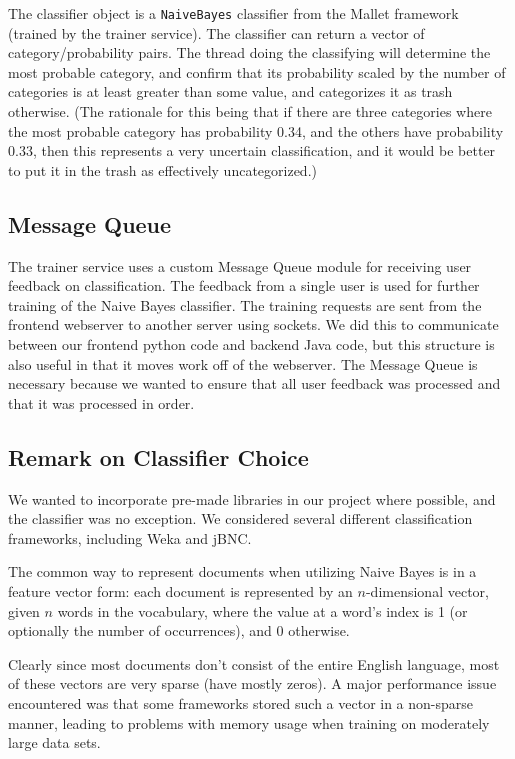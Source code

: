\documentclass[letterpaper]{article}
\begin{document}
The classifier object is a \texttt{NaiveBayes} classifier from the Mallet framework (trained by the trainer service). The classifier can return a vector of category/probability pairs. The thread doing the classifying will determine the most probable category, and confirm that its probability scaled by the number of categories is at least greater than some value, and categorizes it as trash otherwise. (The rationale for this being that if there are three categories where the most probable category has probability 0.34, and the others have probability 0.33, then this represents a very uncertain classification, and it would be better to put it in the trash as effectively uncategorized.)

\subsection{Message Queue}
\label{MessageQueueSection}
The trainer service uses a custom Message Queue module for receiving user feedback on classification. The feedback from a single user is used for further training of the Naive Bayes classifier. The training requests are sent from the frontend webserver to another server using sockets. We did this to communicate between our frontend python code and backend Java code, but this structure is also useful in that it moves work off of the webserver. The Message Queue is necessary because we wanted to ensure that all user feedback was processed and that it was processed in order.

\subsection{Remark on Classifier Choice}
We wanted to incorporate pre-made libraries in our project where possible, and the classifier was no exception. We considered several different classification frameworks, including Weka and jBNC.

The common way to represent documents when utilizing Naive Bayes is in a feature vector form: each document is represented by an $n$-dimensional vector, given $n$ words in the vocabulary, where the value at a word's index is 1 (or optionally the number of occurrences), and 0 otherwise.

Clearly since most documents don't consist of the entire English language, most of these vectors are very sparse (have mostly zeros).
A major performance issue encountered was that some frameworks stored such a vector in a non-sparse manner, leading to problems with memory usage when training on moderately large data sets.
\end{document}
